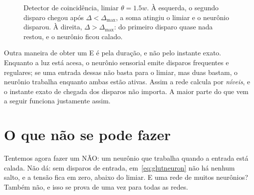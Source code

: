 \begin{figure}[t]
\centering
{}
\caption{Detector de coincidência, limiar $\theta=1.5w$. À esquerda, o segundo disparo chegou após $\Delta<\Delta_{\max}$, a soma atingiu o limiar e o neurônio disparou. À direita, $\Delta>\Delta_{\max}$: do primeiro disparo quase nada restou, e o neurônio ficou calado.}
\label{fig:coincidence}
\end{figure}

Outra maneira de obter um E é pela duração, e não pelo instante exato. Enquanto a luz está acesa, o neurônio sensorial emite disparos frequentes e regulares; se uma entrada dessas não basta para o limiar, mas duas bastam, o neurônio trabalha enquanto ambas estão ativas. Assim a rede calcula por \emph{níveis}, e o instante exato de chegada dos disparos não importa. A maior parte do que vem a seguir funciona justamente assim.

\section{O que não se pode fazer}

Tentemos agora fazer um NÃO: um neurônio que trabalha quando a entrada está calada. Não dá: sem disparos de entrada, em~\eqref{eq:glutneuron} não há nenhum salto, e a tensão fica em zero, abaixo do limiar. E uma rede de muitos neurônios? Também não, e isso se prova de uma vez para todas as redes.

